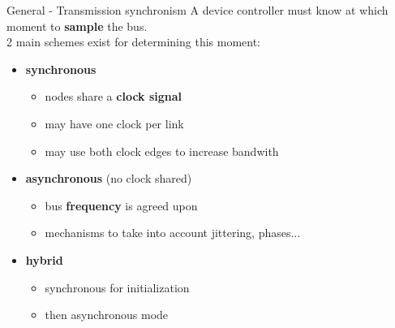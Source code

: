 \begin{frame}{General - Transmission synchronism}
  A device controller must know at which moment to \textbf{sample} the bus.\\
  2 main schemes exist for determining this moment:
  \begin{itemize}
  \item \textbf{synchronous}
    \begin{itemize}
    \item nodes share a \textbf{clock signal}
    \item may have one clock per link
    \item may use both clock edges to increase bandwith
    \end{itemize}
  \item \textbf{asynchronous} (no clock shared)
    \begin{itemize}
    \item bus \textbf{frequency} is agreed upon
    \item mechanisms to take into account jittering, phases...
    \end{itemize}
  \item \textbf{hybrid}
    \begin{itemize}
    \item synchronous for initialization
    \item then asynchronous mode
    \end{itemize}
  \end{itemize}
\end{frame}

